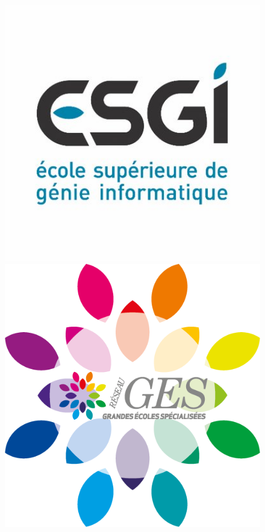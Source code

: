 \documentclass[12pt]{report}
\begin{document}
    \begin{titlepage}
    \begin{center}
    
    \begin{figure}
        \begin{minipage}{0.33\textwidth}
            \includegraphics[width=1\textwidth]{Images/esgi}
        \end{minipage}
        \hspace{5 cm}
        \begin{minipage}{0.33\textwidth}
            \includegraphics[width=1\textwidth]{Images/geslogo} 

\end{minipage}
\end{figure}
\end{center}
\end{titlepage}
\end{document}
